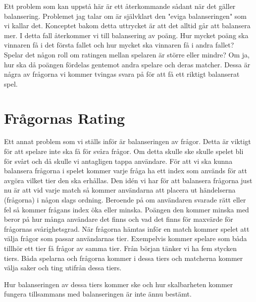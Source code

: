 \documentclass[11pt,a4paper]{article}
\begin{document}
Ett problem som kan uppstå här är ett återkommande sådant när det gäller balansering. Problemet jag talar om är självklart den "eviga balanseringen" som vi kallar det. Konceptet bakom detta uttrycket är att det alltid går att balansera mer. I detta fall återkommer vi till balansering av poäng. Hur mycket poäng ska vinnaren få i det första fallet och hur mycket ska vinnaren få i andra fallet? Spelar det någon roll om ratingen mellan spelaren är större eller mindre? Om ja, hur ska då poängen fördelas gentemot andra spelare och deras matcher. 
Dessa är några av frågorna vi kommer tvingas svara på för att få ett riktigt balanserat spel.

\newpage

\section{Frågornas Rating} 
Ett annat problem som vi ställs inför är balanseringen av frågor. Detta är viktigt för att spelare inte ska få för svåra frågor. Om detta skulle ske skulle spelet bli för svårt och då skulle vi antagligen tappa användare. För att vi ska kunna balansera frågorna i spelet kommer varje fråga ha ett index som används för att avgöra vilket tier den ska erhållas.
Den idén vi har för att balansera frågorna just nu är att vid varje match så kommer användarna att placera ut händelserna (frågorna) i någon slags ordning. Beroende på om användaren svarade rätt eller fel så kommer frågans index öka eller minska. Poängen den kommer minska med beror på hur många användare det finns och vad det finns för maxvärde för frågornas svårighetsgrad. 
När frågorna hämtas inför en match kommer spelet att välja frågor som passar användarnas tier. Exempelvis kommer spelare som båda tillhör ett tier få frågor av samma tier. 
Från början tänker vi ha fem stycken tiers. Båda spelarna och frågorna kommer \cite{placeras} i dessa tiers och matcherna kommer välja saker och ting utifrån dessa tiers.

Hur balanseringen av dessa tiers kommer ske och hur skalbarheten kommer fungera tillsammans med balanseringen är inte ännu bestämt. 
\end{document}
